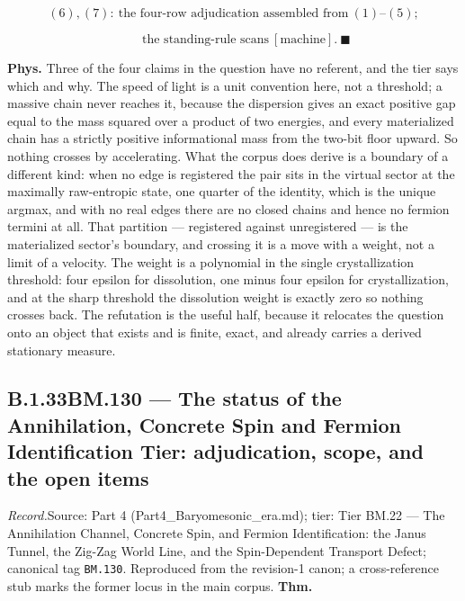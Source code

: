 \documentclass[11pt,openany]{report}
\theoremstyle{canonplain}
\theoremstyle{canondef}
\begin{document}
\[
(6),(7):\ \text{the four-row adjudication assembled from}\ (1)\text{--}(5);
\]

\[
\qquad \text{the standing-rule scans}\ [\text{machine}].\ \blacksquare
\]

\textbf{Phys.} Three of the four claims in the question have no referent, and the tier says which and why. The speed of light is a unit convention here, not a threshold; a massive chain never reaches it, because the dispersion gives an exact positive gap equal to the mass squared over a product of two energies, and every materialized chain has a strictly positive informational mass from the two-bit floor upward. So nothing crosses by accelerating. What the corpus does derive is a boundary of a different kind: when no edge is registered the pair sits in the virtual sector at the maximally raw-entropic state, one quarter of the identity, which is the unique argmax, and with no real edges there are no closed chains and hence no fermion termini at all. That partition — registered against unregistered — is the materialized sector's boundary, and crossing it is a move with a weight, not a limit of a velocity. The weight is a polynomial in the single crystallization threshold: four epsilon for dissolution, one minus four epsilon for crystallization, and at the sharp threshold the dissolution weight is exactly zero so nothing crosses back. The refutation is the useful half, because it relocates the question onto an object that exists and is finite, exact, and already carries a derived stationary measure.

\medskip
\subsection*{\texorpdfstring{B.1.33\quad BM.130 — The status of the Annihilation, Concrete Spin and Fermion Identification Tier: adjudication, scope, and the open items}{BM.130 B.1.33}}
\label{tag:BM-130}
{\small \textit{Record.}\quad Source: Part 4 (Part4\_Baryomesonic\_era.md); tier: Tier BM.22 — The Annihilation Channel, Concrete Spin, and Fermion Identification: the Janus Tunnel, the Zig-Zag World Line, and the Spin-Dependent Transport Defect; canonical tag \texttt{BM.130}. Reproduced from the revision-1 canon; a cross-reference stub marks the former locus in the main corpus.}
\medskip
\textbf{Thm.}
\end{document}
